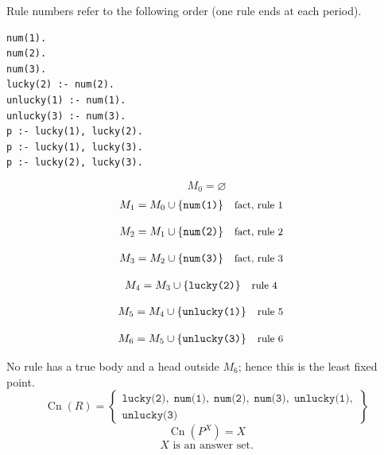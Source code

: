 \documentclass[a4paper,11pt]{article}
\newif\ifexplain
\newcommand{\explain}[1]{\ifexplain\begin{erklbox}#1\end{erklbox}\fi}
\newcommand{\why}[1]{\text{\small #1}}
\newcommand{\at}[1]{\texttt{#1}}
\begin{document}
Rule numbers refer to the following order (one rule ends at each period).
\begin{small}
\begin{verbatim}
num(1).
num(2).
num(3).
lucky(2) :- num(2).
unlucky(1) :- num(1).
unlucky(3) :- num(3).
p :- lucky(1), lucky(2).
p :- lucky(1), lucky(3).
p :- lucky(2), lucky(3).
\end{verbatim}
\end{small}
\explain{Beim Redukt bleibt die Kandidatenmenge fest. Wir entscheiden zuerst, welche Regeln wegfallen. Erst danach berechnen wir aus den verbleibenden positiven Regeln die kleinste abgeschlossene Menge. Ein Modell allein reicht nicht: Diese Menge muss genau der Kandidat sein.}
\[
M_0=\varnothing
\]
\begin{align*}
M_{1} &= M_{0}\cup \{\at{num(1)}\} && \why{fact, rule 1}
\end{align*}
\explain{Diese Regel hat keinen Körper. Ihr Kopf $\at{num(1)}$ ist damit ein Fakt und muss in die Menge.}
\begin{align*}
M_{2} &= M_{1}\cup \{\at{num(2)}\} && \why{fact, rule 2}
\end{align*}
\explain{Diese Regel hat keinen Körper. Ihr Kopf $\at{num(2)}$ ist damit ein Fakt und muss in die Menge.}
\begin{align*}
M_{3} &= M_{2}\cup \{\at{num(3)}\} && \why{fact, rule 3}
\end{align*}
\explain{Diese Regel hat keinen Körper. Ihr Kopf $\at{num(3)}$ ist damit ein Fakt und muss in die Menge.}
\begin{align*}
M_{4} &= M_{3}\cup \{\at{lucky(2)}\} && \why{rule 4}
\end{align*}
\explain{Für $\at{lucky(2)}$ brauchen wir $\at{num(2)}$. Weil diese Voraussetzungen bereits hergeleitet sind, dürfen wir den Regelkopf jetzt aufnehmen und alle bisherigen Atome behalten; bei einer fehlenden Voraussetzung würde diese Regel dagegen noch nichts beitragen.}
\begin{align*}
M_{5} &= M_{4}\cup \{\at{unlucky(1)}\} && \why{rule 5}
\end{align*}
\explain{Für $\at{unlucky(1)}$ brauchen wir $\at{num(1)}$. Weil diese Voraussetzungen bereits hergeleitet sind, dürfen wir den Regelkopf jetzt aufnehmen und alle bisherigen Atome behalten; bei einer fehlenden Voraussetzung würde diese Regel dagegen noch nichts beitragen.}
\begin{align*}
M_{6} &= M_{5}\cup \{\at{unlucky(3)}\} && \why{rule 6}
\end{align*}
\explain{Für $\at{unlucky(3)}$ brauchen wir $\at{num(3)}$. Weil diese Voraussetzungen bereits hergeleitet sind, dürfen wir den Regelkopf jetzt aufnehmen und alle bisherigen Atome behalten; bei einer fehlenden Voraussetzung würde diese Regel dagegen noch nichts beitragen.}
No rule has a true body and a head outside $M_{6}$; hence this is the least fixed point.
\[
\operatorname{Cn}(R)=\left\{\begin{gathered}\at{lucky(2)},\;\at{num(1)},\;\at{num(2)},\;\at{num(3)},\;\at{unlucky(1)},\\\at{unlucky(3)}\end{gathered}\right\}
\]
\[
\operatorname{Cn}(P^X)=X
\]
\[
\boxed{X\text{ is an answer set.}}
\]
\end{document}
